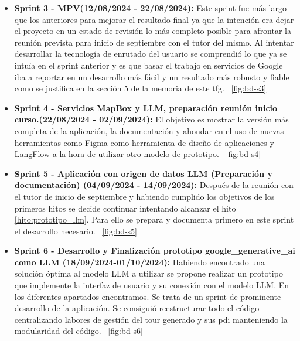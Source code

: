 \begin{itemize}
    \item \textbf{Sprint 3 - MPV(12/08/2024 - 22/08/2024):} Este sprint fue más largo que los anteriores para mejorar el resultado final ya que la intención era dejar el proyecto en un estado de revisión lo más completo posible para afrontar la reunión prevista para inicio de septiembre con el tutor del mismo. Al intentar desarrollar la tecnología de enrutado del usuario se comprendió lo que ya se intuía en el sprint anterior y es que basar el trabajo en servicios de Google iba a reportar en un desarrollo más fácil y un resultado más robusto y fiable como se justifica en la sección 5 de la memoria de este \acrshort{tfg}.
~\ref{fig:bd-s3}
    
    \item \textbf{Sprint 4 - Servicios MapBox y LLM, preparación reunión inicio curso.(22/08/2024 - 02/09/2024):} El objetivo es mostrar la versión más completa de la aplicación, la documentación y ahondar en el uso de nuevas herramientas como Figma como herramienta de diseño de aplicaciones y LangFlow a la hora de utilizar otro modelo de prototipo.
    ~\ref{fig:bd-s4}
    
\item \textbf{Sprint 5 - Aplicación con origen de datos LLM (Preparación y documentación) (04/09/2024 - 14/09/2024):} Después de la reunión con el tutor de inicio de septiembre y habiendo cumplido los objetivos de los primeros hitos se decide continuar intentando alcanzar el hito \ref{hito:prototipo_llm}. Para ello se prepara y documenta primero en este sprint el desarrollo necesario.
~\ref{fig:bd-s5}

\item \textbf{Sprint 6 - Desarrollo y Finalización prototipo google\_generative\_ai como LLM (18/09/2024-01/10/2024):} Habiendo encontrado una solución óptima al modelo LLM a utilizar se propone realizar un prototipo que implemente la interfaz de usuario y su conexión con el modelo LLM. En los diferentes apartados encontramos. Se trata de un sprint de prominente desarrollo de la aplicación. Se consiguió reestructurar todo el código centralizando labores de gestión del tour generado y sus \acrshort{pdi} manteniendo la modularidad del código.
~\ref{fig:bd-s6}
	

\end{itemize}
